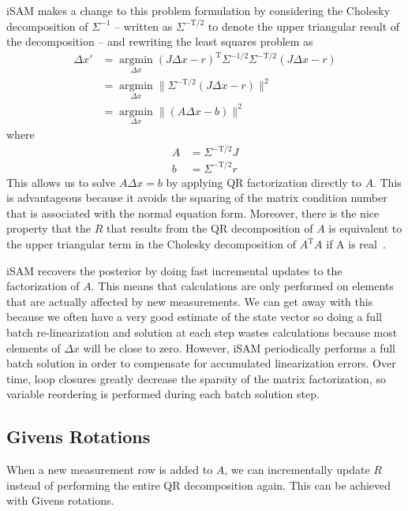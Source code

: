 \documentclass[conference]{IEEEtran}
\begin{document}
iSAM makes a change to this problem formulation by considering the Cholesky decomposition
of $\Sigma^{-1}$ -- written as $\Sigma^{-\text{T}/2}$ to denote the upper triangular
result of the decomposition --  and rewriting the least squares problem as
\begin{align*}
    \Delta x' &= \underset{\Delta x}{\operatorname{argmin}} (J\Delta x - r)^{\text{T}}
\Sigma^{-1/2}\Sigma^{-\text{T}/2} (J\Delta x - r) \\
  &= \underset{\Delta x}{\operatorname{argmin}} \| \Sigma^{-\text{T}/2}(J\Delta x - r)
  \|^2\\
&= \underset{\Delta x}{\operatorname{argmin}} \| (A\Delta x - b)\|^2
\end{align*}
where
\begin{align*}
  A &= \Sigma^{-\text{T}/2}J \\
  b &= \Sigma^{-\text{T}/2}r
\end{align*}
This allows us to solve $A\Delta x = b$ by applying QR factorization directly to $A$. This
is advantageous because it avoids the squaring of the matrix condition number that is
associated with the normal equation form. Moreover, there is the nice property that the
$R$ that results from the QR decomposition of $A$ is equivalent to the upper triangular
term in the Cholesky decomposition of $A^{\text{T}}A$ if A is real~\cite{Kaess08tro}.

iSAM recovers the posterior by doing fast incremental updates to the factorization of $A$.
This means that calculations are only performed on elements that are actually affected by
new measurements. We can get away with this because we often have a very good estimate of
the state vector so doing a full batch re-linearization and solution at each step wastes
calculations because most elements of $\Delta x$ will be close to zero. However, iSAM
periodically performs a full batch solution in order to compensate for accumulated
linearization errors. Over time, loop closures greatly decrease the sparsity of the matrix
factorization, so variable reordering is performed during each batch solution step.

\subsection{Givens Rotations}
\label{sub:givensrotations}

When a new measurement row is added to $A$, we can incrementally update $R$
instead of performing the entire QR decomposition again. This can be achieved with Givens
rotations.
\end{document}
